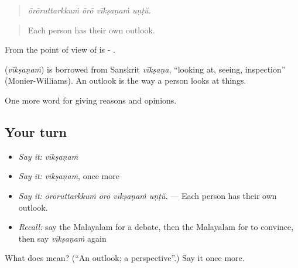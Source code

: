 \begin{quote}
\emph{ōrōruttarkkuṁ ōrō vīkṣaṇaṁ uṇṭŭ.}
\end{quote}

\begin{quote}
Each person has their own outlook.
\end{quote}

From the point of view of is - .

\begin{cousinweb}
\textbf{} (\emph{vīkṣaṇaṁ}) is borrowed from Sanskrit \emph{vīkṣaṇa}, \textquotedblleft{}looking at, seeing, inspection\textquotedblright{} (Monier-Williams). An outlook is the way a person looks at things.
\end{cousinweb}

\begin{grammarlens}[title={What you've built}]
One more word for giving reasons and opinions.
\end{grammarlens}

\subsection*{Your turn}
\begin{itemize}
\raggedright
  \item \emph{Say it:} \emph{vīkṣaṇaṁ}
  \item \emph{Say it:} \emph{vīkṣaṇaṁ}, once more
  \item \emph{Say it:} \emph{ōrōruttarkkuṁ ōrō vīkṣaṇaṁ uṇṭŭ.} — Each person has their own outlook.
  \item \emph{Recall:} say the Malayalam for a debate, then the Malayalam for to convince, then say \emph{vīkṣaṇaṁ} again
\end{itemize}

\begin{tcolorbox}[breakable,colback=teal!4,colframe=teal!35!black,title={Before you move on}]
What does  mean? (\textquotedblleft{}An outlook; a perspective\textquotedblright{}.) Say it once more.
\end{tcolorbox}

